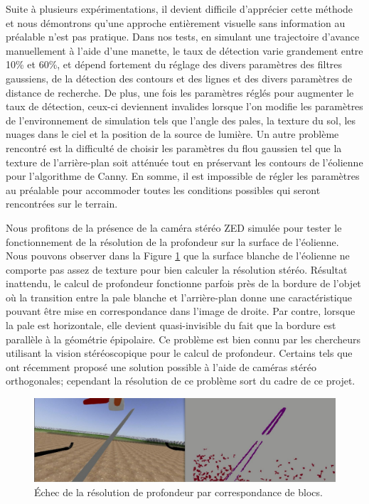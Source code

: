Suite à plusieurs expérimentations, il devient difficile d'apprécier cette méthode et nous démontrons qu'une approche entièrement visuelle sans information au préalable n'est pas pratique. Dans nos tests, en simulant une trajectoire d'avance manuellement à l'aide d'une manette, le taux de détection varie grandement entre 10\% et 60\%, et dépend fortement du réglage des divers paramètres des filtres gaussiens, de la détection des contours et des lignes et des divers paramètres de distance de recherche. De plus, une fois les paramètres réglés pour augmenter le taux de détection, ceux-ci deviennent invalides lorsque l'on modifie les paramètres de l'environnement de simulation tels que l'angle des pales, la texture du sol, les nuages dans le ciel et la position de la source de lumière. Un autre problème rencontré est la difficulté de choisir les paramètres du flou gaussien tel que la texture de l'arrière-plan soit atténuée tout en préservant les contours de l'éolienne pour l'algorithme de Canny. En somme, il est impossible de régler les paramètres au préalable pour accommoder toutes les conditions possibles qui seront rencontrées sur le terrain.

Nous profitons de la présence de la caméra stéréo ZED simulée pour tester le fonctionnement de la résolution de la profondeur sur la surface de l'éolienne. Nous pouvons observer dans la Figure \ref{fig:stereo_fail} que la surface blanche de l'éolienne ne comporte pas assez de texture pour bien calculer la résolution stéréo. Résultat inattendu, le calcul de profondeur fonctionne parfois près de la bordure de l'objet où la transition entre la pale blanche et l'arrière-plan donne une caractéristique pouvant être mise en correspondance dans l'image de droite. Par contre, lorsque la pale est horizontale, elle devient quasi-invisible du fait que la bordure est parallèle à la géométrie épipolaire. Ce problème est bien connu par les chercheurs utilisant la vision stéréoscopique pour le calcul de profondeur. Certains tels que \citep{meier2017real} ont récemment proposé une solution possible à l'aide de caméras stéréo orthogonales; cependant la résolution de ce problème sort du cadre de ce projet.

\begin{figure}[htb]
  \includegraphics[width=\linewidth]{images/stereo_failure.jpg}
  \caption{Échec de la résolution de profondeur par correspondance de blocs.}
  \label{fig:stereo_fail}
\end{figure}

